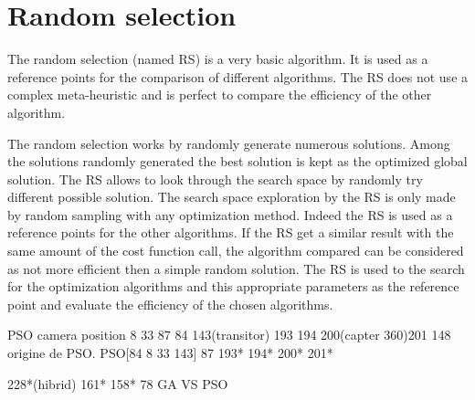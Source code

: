 

\section{Random selection }

The random selection (named RS) is a very basic algorithm. It is used as a reference points for the comparison of different algorithms. The RS does not use a complex meta-heuristic and is perfect to compare the efficiency of the other algorithm.

The random selection works by randomly generate numerous solutions. Among the solutions randomly generated the best solution is kept as the optimized global solution. The RS allows to look through the search space by randomly try different  possible solution. The search space exploration by the RS is only made by random sampling with any optimization method. 
Indeed the RS is used as a reference points for the other algorithms. If the RS get a similar result with the same amount of the cost function call, the algorithm compared can be considered as not more efficient then a simple random solution. 
The RS is used to the search for the optimization algorithms and this appropriate parameters as the reference point and evaluate the efficiency of the chosen algorithms.


  

PSO camera position 
8 33 87 84 143(transitor) 193 194 200(capter 360)201
148 origine de PSO. 
PSO[84 8 33 143] 87 193* 194* 200* 201* 

228*(hibrid) 161* 158* 78 GA VS PSO


